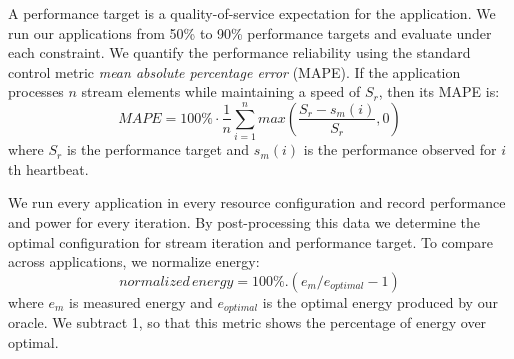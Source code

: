 A performance target is a quality-of-service expectation for the
application. We run our applications from 50\% to 90\% performance
targets and evaluate \SYSTEM{} under each constraint. We quantify the
performance reliability using the standard control metric \emph{mean
  absolute percentage error} (MAPE).  If the application processes $n$
stream elements while maintaining a speed of $S_r$, then its MAPE is:
\begin{equation}
MAPE = 100\% \cdot \frac{1}{n} \sum\limits_{i=1}^{n} max \left( \frac{S_{r} - s_m(i)}{S_r},0 \right)
\end{equation}
where $S_{r}$ is the performance target and $s_m(i)$ is the
performance observed for $i$th heartbeat.


We run every application in every resource configuration and record
performance and power for every iteration.  By post-processing this
data we determine the optimal configuration for stream iteration and
performance target. To compare across applications, we normalize
energy:
\begin{equation}
  normalized\,energy = 100\% . (e_m / e_{optimal} - 1)
\end{equation}
where $e_m$ is measured energy and $e_{optimal}$ is the optimal energy
produced by our oracle. We subtract 1, so that this metric shows the
percentage of energy over optimal.  

